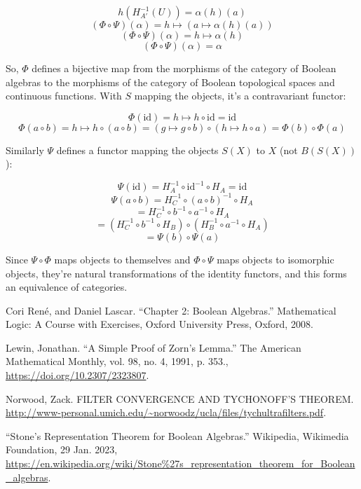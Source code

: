 \documentclass{article}
\begin{document}
      \[ h ( H_{A'}^{-1} (U)) = \alpha(h)(a)\] \[(\Phi \circ \Psi)(\alpha) = h
      \mapsto (a \mapsto \alpha(h)(a))\] \[(\Phi \circ \Psi)(\alpha) =  h
      \mapsto \alpha(h)\] \[(\Phi \circ \Psi)(\alpha) = \alpha\]

      So, $\Phi$ defines a bijective map from the morphisms of the category of Boolean
      algebras to the morphisms of the category of Boolean
      topological spaces and continuous functions. With $S$ mapping the objects,
      it's a contravariant functor:

      \[ \Phi(\text{id}) = h \mapsto h \circ \text{id} = \text{id} \]
      \[ \Phi(a \circ b) = h \mapsto h \circ (a \circ b) = (g \mapsto g \circ b)
      \circ (h \mapsto h \circ a) = \Phi(b) \circ \Phi(a) \]

      Similarly $\Psi$ defines a functor mapping the objects $S(X)$ to $X$ (not
      $B(S(X))$):

      \[ \Psi(\text{id}) = H_A^{-1} \circ \text{id}^{-1} \circ H_A = \text{id} \]
      \[ \Psi(a \circ b) = H_C^{-1} \circ (a \circ b)^{-1} \circ H_A \]
      \[ = H_C^{-1} \circ b^{-1} \circ a^{-1} \circ H_A \]
      \[ = (H_C^{-1} \circ b^{-1} \circ H_B) \circ (H_B^{-1} \circ a^{-1} \circ
      H_A) \]
      \[ = \Psi(b) \circ \Psi(a) \]

      Since $\Psi \circ \Phi$ maps objects to themselves and $\Phi \circ \Psi$
      maps objects to isomorphic objects, they're natural transformations of the
      identity functors, and this forms an equivalence of categories.

    \clearpage

    \begin{thebibliography}{9}

       Cori Ren\'e, and Daniel Lascar. “Chapter 2: Boolean
      Algebras.” Mathematical Logic: A Course with Exercises, Oxford University
      Press, Oxford, 2008. 

       Lewin, Jonathan. “A Simple Proof of Zorn's Lemma.” The
      American Mathematical Monthly, vol. 98, no. 4, 1991, p. 353.,
      \url{https://doi.org/10.2307/2323807}.

       Norwood, Zack. FILTER CONVERGENCE AND TYCHONOFF’S THEOREM.
      \url{http://www-personal.umich.edu/~norwoodz/ucla/files/tychultrafilters.pdf}.

       “Stone's Representation Theorem for Boolean Algebras.”
      Wikipedia, Wikimedia Foundation, 29 Jan. 2023,
      \url{https://en.wikipedia.org/wiki/Stone%27s_representation_theorem_for_Boolean_algebras}.

    \end{thebibliography}
\end{document}
